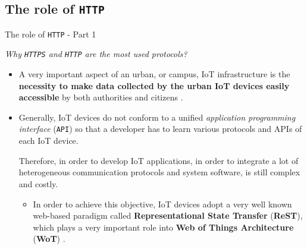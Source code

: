 \documentclass[13.5pt]{beamer}
\begin{document}
\subsection{The role of \texttt{HTTP}}
\begin{frame}{The role of \texttt{HTTP} - Part 1}

\begin{alertblock}{}
\textit{Why \texttt{HTTPS} and \texttt{HTTP} are the most used protocols?}
\end{alertblock}

\begin{itemize}
\justifying
\item A very important aspect of an urban, or campus, IoT infrastructure is the \textbf{necessity to make data collected by the urban IoT devices easily accessible} by both authorities and citizens \cite{IOTCITY}. 

\item Generally, IoT devices do not conform to a unified \textit{application programming interface} (\texttt{API}) so that a developer has to learn various protocols and APIs of each IoT device. 

Therefore, in order to develop IoT applications, in order to integrate a lot of heterogeneous communication protocols and system software, is still complex and costly. 

\begin{itemize}
\justifying
\item In order to achieve this objective, IoT devices adopt a very well known web-based paradigm called  \textbf{Representational State Transfer} (\textbf{ReST}), which plays a very important role into \textbf{Web of Things Architecture} (\textbf{WoT}) \cite{IOTCITY}\cite{WOT}.
\end{itemize}
\end{itemize}

\end{frame} 
\end{document}
